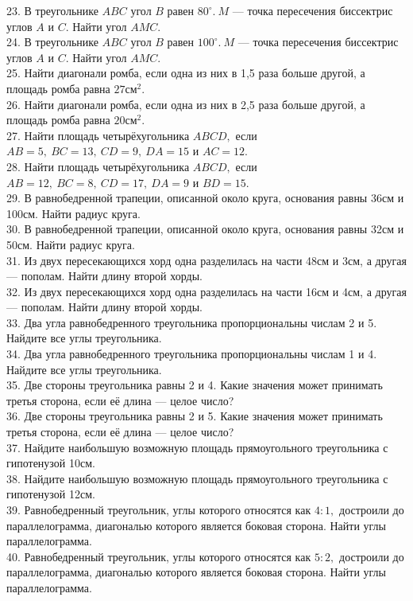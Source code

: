 23. В треугольнике $ABC$ угол $B$ равен $80^\circ.\ M$ --- точка пересечения биссектрис углов $A$ и $C.$ Найти угол $AMC.$\\
24. В треугольнике $ABC$ угол $B$ равен $100^\circ.\ M$ --- точка пересечения биссектрис углов $A$ и $C.$ Найти угол $AMC.$\\
25. Найти диагонали ромба, если одна из них в 1,5 раза больше другой, а площадь ромба равна $27\text{см}^2.$\\
26. Найти диагонали ромба, если одна из них в 2,5 раза больше другой, а площадь ромба равна $20\text{см}^2.$\\
27. Найти площадь четырёхугольника $ABCD,$ если $AB=5,\ BC=13,\ CD=9,\ DA=15$ и $AC=12.$\\
28. Найти площадь четырёхугольника $ABCD,$ если $AB=12,\ BC=8,\ CD=17,\ DA=9$ и $BD=15.$\\
29. В равнобедренной трапеции, описанной  около круга, основания равны 36см и 100см. Найти радиус круга.\\
30. В равнобедренной трапеции, описанной  около круга, основания равны 32см и 50см. Найти радиус круга.\\
31. Из двух пересекающихся хорд одна разделилась на части 48см и 3см, а другая --- пополам. Найти длину второй хорды.\\
32. Из двух пересекающихся хорд одна разделилась на части 16см и 4см, а другая --- пополам. Найти длину второй хорды.\\
33. Два угла равнобедренного треугольника пропорциональны числам 2 и 5. Найдите все углы треугольника.\\
34. Два угла равнобедренного треугольника пропорциональны числам 1 и 4. Найдите все углы треугольника.\\
35. Две стороны треугольника равны 2 и 4. Какие значения может принимать третья сторона, если её длина --- целое число?\\
36. Две стороны треугольника равны 2 и 5. Какие значения может принимать третья сторона, если её длина --- целое число?\\
37. Найдите наибольшую возможную площадь прямоугольного треугольника с гипотенузой 10см.\\
38. Найдите наибольшую возможную площадь прямоугольного треугольника с гипотенузой 12см.\\
39. Равнобедренный треугольник, углы которого относятся как $4:1,$ достроили до параллелограмма, диагональю которого является боковая сторона. Найти углы параллелограмма.\\
40. Равнобедренный треугольник, углы которого относятся как $5:2,$ достроили до параллелограмма, диагональю которого является боковая сторона. Найти углы параллелограмма.\\
